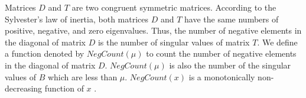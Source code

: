 Matrices $D$ and $T$ are two congruent symmetric matrices.
According to the Sylvester's law of inertia, both matrices $D$ and $T$ have the same numbers of positive, negative, and zero eigenvalues.
Thus, the number of negative elements in the diagonal of matrix $D$ is the number of singular values of matrix $T$.
We define a function denoted by $NegCount(\mu)$ to count the number of negative elements in the diagonal of matrix $D$. %
$NegCount(\mu)$ is also the number of the singular values of $B$ which are less than $\mu$.
$NegCount(x)$ is a monotonically non-decreasing function of $x$ \cite{95ETNAbisecion}.
% 

%

